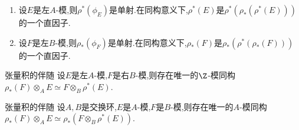 \begin{corollary}{}{}
	\begin{enumerate}
		\item 设$E$是左$A$-模,则$\rho^{\ast}\left(\phi_{E}\right)$是单射.在同构意义下,$\rho^{\ast}\left(E\right)$是$\rho^{\ast}\left(\rho_{\ast}\left(\rho^{\ast}\left(E\right)\right)\right)$的一个直因子.
		\item 设$F$是左$B$-模,则$\rho_{\ast}\left(\phi_{F}\right)$是单射.在同构意义下,$\rho_{\ast}\left(F\right)$是$\rho_{\ast}\left(\rho^{\ast}\left(\rho_{\ast}\left(F\right)\right)\right)$的一个直因子.
	\end{enumerate}
\end{corollary}

\begin{corollary}{张量积的伴随}{}
	设$E$是左$A$-模,$F$是右$B$-模,则存在唯一的$\Z$-模同构$\rho_{\ast}\left(F\right)\otimes_{A} E\simeq F\otimes_{B}\rho^{\ast}\left(E\right)$.
\end{corollary}

\begin{corollary}{张量积的伴随}{}
	设$A,B$是交换环,$E$是$A$-模,$F$是$B$-模,则存在唯一的$A$-模同构$\rho_{\ast}\left(F\right)\otimes_{A} E\simeq \rho_{\ast}\left(F\otimes_{B}\rho^{\ast}\left(E\right)\right)$.
\end{corollary}



